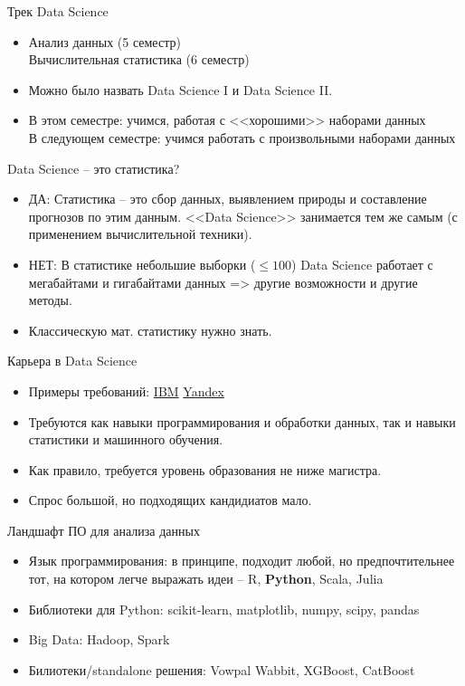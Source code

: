 \documentclass[landscape]{slides}
\begin{document}
\begin{slide}
Трек Data Science
\begin{itemize}
\item Анализ данных (5 семестр)\\
Вычислительная статистика (6 семестр)
\item Можно было назвать Data Science I и Data Science II.
\item В этом семестре: учимся, работая с <<хорошими>> наборами данных
\\
В следующем семестре: учимся работать с произвольными наборами данных
\end{itemize}
\end{slide}


\begin{slide}
Data Science -- это статистика?
\begin{itemize}
\item ДА: Статистика -- это сбор данных, выявлением природы
и составление прогнозов по этим данным.
<<Data Science>> занимается тем же самым (с применением вычислительной техники).
\item НЕТ: В статистике небольшие выборки ($\leq 100$)
Data Science работает с мегабайтами и гигабайтами данных
=> другие возможности и другие методы.
\item Классическую мат. статистику нужно знать.
\end{itemize}	
\end{slide}


\begin{slide}
Карьера в Data Science
\begin{itemize}
\item Примеры требований: \href{https://krb-sjobs.brassring.com/TGnewUI/Search/home/HomeWithPreLoad?PageType=JobDetails\&partnerid=26059\&siteid=5016\&jobid=67756\&AReq=59032BR\#jobDetails=67756\_5016}{IBM}
\href{https://yandex.ru/jobs/vacancies/dev/res\_dmir/}{Yandex}
\item Требуются как навыки программирования и обработки данных, так и навыки статистики и машинного обучения.
\item Как правило, требуется уровень образования не ниже магистра.
\item Спрос большой, но подходящих кандидиатов мало.
\end{itemize}	
\end{slide}


\begin{slide}
Ландшафт ПО для анализа данных
\begin{itemize}
\item Язык программирования: в принципе, подходит любой, но
предпочтительнее тот, на котором легче выражать идеи -- R, {\bf Python}, Scala, Julia
\item Библиотеки для Python: scikit-learn, matplotlib, numpy, scipy, pandas
\item Big Data: Hadoop, Spark
\item Билиотеки/standalone решения: Vowpal Wabbit, XGBoost, CatBoost
\end{itemize}	
\end{slide}
\end{document}
